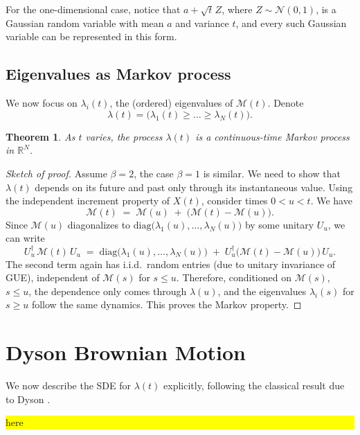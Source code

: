 \documentclass[letterpaper,11pt,oneside,reqno]{article}
\numberwithin{equation}{section}
\newcommand{\ssp}{\hspace{1pt}}
\newtheorem{theorem}[proposition]{Theorem}
\theoremstyle{definition}
\begin{document}
For the one-dimensional case, notice that $a+\sqrt t\ssp Z$, where $Z\sim \mathcal{N}(0,1)$, is a Gaussian random variable with mean $a$ and variance $t$, and every such Gaussian variable can be represented in this form.

\subsection{Eigenvalues as Markov process}
We now focus on $\lambda_i(t)$, the (ordered) eigenvalues of $\mathcal{M}(t)$. Denote
\[
\lambda(t) = \bigl(\lambda_1(t)\ge \dots \ge \lambda_N(t)\bigr).
\]
\begin{theorem}
\label{thm:lambda_is_markov}
As $t$ varies, the process $\lambda(t)$ is a continuous-time Markov process in $\mathbb{R}^N$.
\end{theorem}
\begin{proof}[Sketch of proof]
	Assume $\beta=2$, the case $\beta=1$ is similar.
We need to show that $\lambda(t)$ depends on its future and past only through its instantaneous value. Using the independent increment property of $X(t)$, consider times $0< u< t$. We have
\[
\mathcal{M}(t) \;=\; \mathcal{M}(u)\;+\;\bigl(\mathcal{M}(t)-\mathcal{M}(u)\bigr).
\]
Since $\mathcal{M}(u)$ diagonalizes to $\mathrm{diag}\bigl(\lambda_1(u),\ldots,\lambda_N(u)\bigr)$ by some unitary $U_u$, we can write
\[
U_u^\dagger\,\mathcal{M}(t)\,U_u \;=\;\mathrm{diag}\bigl(\lambda_1(u),\ldots,\lambda_N(u)\bigr)\;+\; U_u^\dagger\bigl(\mathcal{M}(t)-\mathcal{M}(u)\bigr)\,U_u.
\]
The second term again has i.i.d.\ random entries (due to unitary invariance of
GUE), independent of $\mathcal{M}(s)$ for $s\le u$.
Therefore, conditioned on $\mathcal{M}(s)$, $s\le u$, the dependence only
comes through $\lambda(u)$, and the eigenvalues $\lambda_i(s)$ for $s\ge u$ follow
the same dynamics. This proves the Markov property.
\end{proof}

\section{Dyson Brownian Motion}
We now describe the SDE for $\lambda(t)$ explicitly, following the classical result due to Dyson
\cite{dyson1962brownian}.

\colorbox{yellow}{\parbox{.7\textwidth}{here}}
\end{document}
